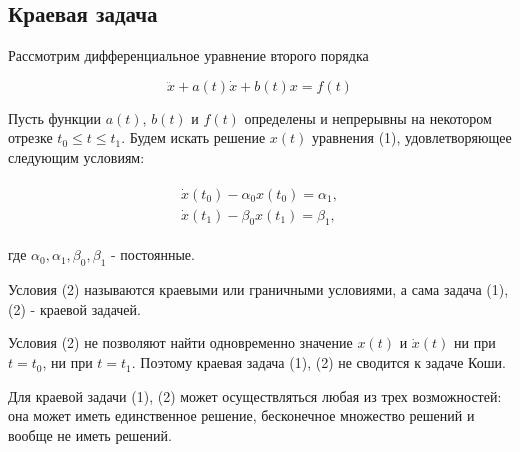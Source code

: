 \documentclass{article}
\theoremstyle{plain} \newtheorem*{theorem*}{Теорема}
\theoremstyle{plain} \newtheorem{theorem}{Теорема}[section]
\theoremstyle{defintition} \newtheorem*{corollary*}{Следствие}
\theoremstyle{remark} \newtheorem*{example*}{Пример}
\theoremstyle{remark} \newtheorem*{remark*}{Замечание}
\begin{document}
\abovedisplayskip=0pt
\belowdisplayskip=9pt
\abovedisplayshortskip=0pt
\belowdisplayshortskip=12pt

\subsection*{Краевая задача}

Рассмотрим дифференциальное уравнение второго порядка

\begin{equation}
    \ddot{x} + a(t)\dot{x} + b(t)x = f(t)
\end{equation}

Пусть функции $a(t)$, $b(t)$ и $f(t)$ определены
и непрерывны на некотором отрезке $t_0 \le t \le t_1$.
Будем искать решение $x(t)$ уравнения (1),
удовлетворяющее следующим условиям:

\begin{gather}
    \begin{split}
        \dot{x}(t_0) - \alpha_0 x(t_0) = \alpha_1, \\
        \dot{x}(t_1) - \beta_0 x(t_1) = \beta_1,
    \end{split}
\end{gather}

где $\alpha_0, \alpha_1, \beta_0, \beta_1$ - постоянные.

Условия (2) называются краевыми или граничными условиями,
а сама задача (1), (2) - краевой задачей.

Условия (2) не позволяют найти одновременно значение
$x(t)$ и $\dot{x}(t)$ ни при $t = t_0$, ни при $t = t_1$.
Поэтому краевая задача (1), (2) не сводится к задаче Коши.

Для краевой задачи (1), (2) может осуществляться
любая из трех возможностей:
она может иметь единственное решение, бесконечное
множество решений и вообще не иметь решений.
\end{document}
